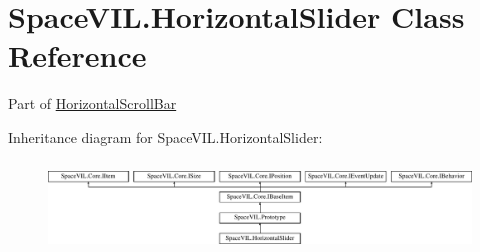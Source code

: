 \hypertarget{class_space_v_i_l_1_1_horizontal_slider}{}\section{Space\+V\+I\+L.\+Horizontal\+Slider Class Reference}
\label{class_space_v_i_l_1_1_horizontal_slider}


Part of \mbox{\hyperlink{class_space_v_i_l_1_1_horizontal_scroll_bar}{Horizontal\+Scroll\+Bar}}  


Inheritance diagram for Space\+V\+I\+L.\+Horizontal\+Slider\+:\begin{figure}[H]
\begin{center}
\leavevmode
\includegraphics[height=2.421622cm]{class_space_v_i_l_1_1_horizontal_slider}
\end{center}
\end{figure}

